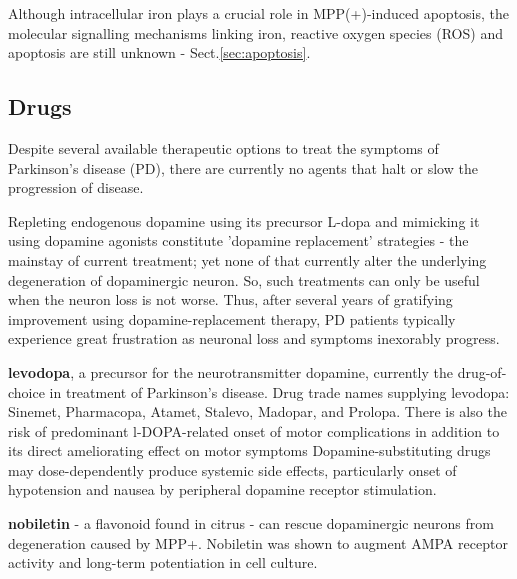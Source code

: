 Although intracellular iron plays a crucial role in MPP(+)-induced apoptosis,
the molecular signalling mechanisms linking iron, reactive oxygen species (ROS)
and apoptosis are still unknown - Sect.\ref{sec:apoptosis}.

  
\subsection{Drugs}
\label{sec:Parkinson-drug-therapy}

Despite several available therapeutic options to treat the symptoms of
Parkinson's disease (PD), there are currently no agents that halt or slow the
progression of disease.

Repleting endogenous dopamine using its precursor L-dopa and mimicking it using
dopamine agonists constitute 'dopamine replacement' strategies - the mainstay of
current treatment; yet none of that currently alter the underlying degeneration
of dopaminergic neuron. So, such treatments can only be useful when the neuron
loss is not worse. Thus, after several years of gratifying improvement using
dopamine-replacement therapy, PD patients typically experience great frustration
as neuronal loss and symptoms inexorably progress.

{\bf levodopa}, a precursor for the neurotransmitter dopamine, currently the
drug-of-choice in treatment of Parkinson's disease. Drug trade names supplying
levodopa: Sinemet, Pharmacopa, Atamet, Stalevo, Madopar, and Prolopa.
There is also the risk of predominant l-DOPA-related onset of motor
complications in addition to its direct ameliorating effect on motor symptoms
Dopamine-substituting drugs may dose-dependently produce systemic side effects,
particularly onset of hypotension and nausea by peripheral dopamine receptor
stimulation. 
 
{\bf nobiletin} - a flavonoid found in citrus - can rescue dopaminergic neurons
from degeneration caused by MPP+. Nobiletin was shown to augment AMPA receptor
activity and long-term potentiation in cell culture.


